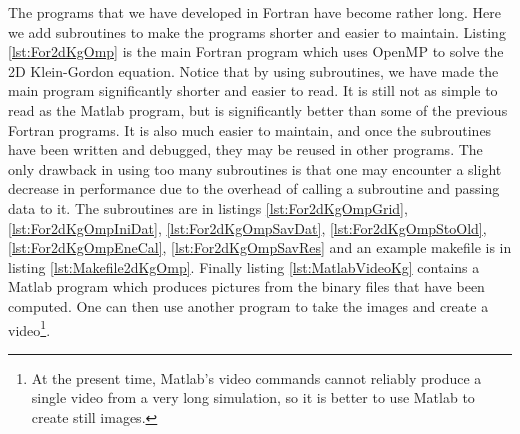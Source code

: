 The programs that we have developed in Fortran have become rather long. Here we add subroutines to make the programs shorter and easier to maintain. Listing \ref{lst:For2dKgOmp} is the main Fortran program which uses OpenMP to solve the 2D Klein-Gordon equation. Notice that by using subroutines, we have made the main program significantly shorter and easier to read. It is still not as simple to read as the Matlab program, but is significantly better than some of the previous Fortran programs. It is also much easier to maintain, and once the subroutines have been written and debugged, they may be reused in other programs. The only drawback in using too many subroutines is that one may encounter a slight decrease in performance due to the overhead of calling a subroutine and passing data to it. The subroutines are in listings \ref{lst:For2dKgOmpGrid}, \ref{lst:For2dKgOmpIniDat}, \ref{lst:For2dKgOmpSavDat}, \ref{lst:For2dKgOmpStoOld}, \ref{lst:For2dKgOmpEneCal}, \ref{lst:For2dKgOmpSavRes} and an example makefile is in listing \ref{lst:Makefile2dKgOmp}. Finally listing \ref{lst:MatlabVideoKg} contains a Matlab program which produces pictures from the binary files that have been computed. One can then use another program to take the images and create a video\footnote{At the present time, Matlab's video commands cannot reliably produce a single video from a very long simulation, so it is better to use Matlab to create still images.}.











